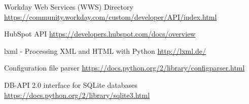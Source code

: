 \begin{thebibliography}{9}
	
	 
	Workday Web Services (WWS) Directory
	\url{https://community.workday.com/custom/developer/API/index.html}
	
	HubSpot API
	\url{https://developers.hubspot.com/docs/overview}
	
	lxml - Processing XML and HTML with Python
	\url{http://lxml.de/}
	 
	 
	Configuration file parser
	\url{https://docs.python.org/2/library/configparser.html}
	 
	
	
	DB-API 2.0 interface for SQLite databases
	\url{https://docs.python.org/2/library/sqlite3.html}
	
	
\end{thebibliography}